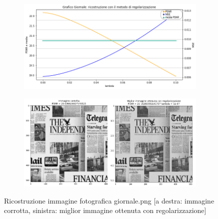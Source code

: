 \begin{figure}[H]
    \centering
    \begin{subfigure}{0.5\textwidth}
        \includegraphics[width=\textwidth]{imgRicostruzione/graficoGiornale_minimize.png}
    \end{subfigure}%
    \begin{subfigure}{0.5\textwidth}
        \centering
        \includegraphics[width=\textwidth]{imgRicostruzione/ricostruzioneGiornale_minimize.png}
    \end{subfigure}
    \caption{Ricostruzione immagine fotografica giornale.png [a destra: immagine corrotta, sinistra: miglior immagine ottenuta con regolarizzazione]}
\end{figure}